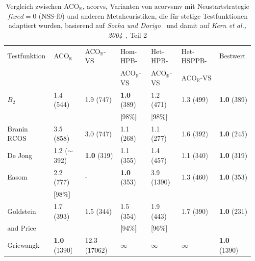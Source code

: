 \documentclass[fontsize=12, a4aper]{scrartcl}
\begin{document}
	\begin{table}[H]
		
		\caption{Vergleich zwischen ACO\(_{\mathbb{R}}\), \acl{acorvs}, Varianten von \acl{acorvsmv} mit Neustartstrategie \(fixed = 0\) (NSS-f0) und anderen Metaheuristiken, die für stetige Testfunktionen adaptiert wurden, basierend auf \textit{Socha und Dorigo}~\cite{socha2008ant} und damit auf \textit{Kern et al., 2004}~\cite{kern2004learning}, Teil 2}
		
		\label{subsec:Vergleich_Von_ACO_R_ACO_R_Very_Simple_Und_Iterationen:tab:Vergleich_Mit_Meta_-_Heuristiken_Adaptiert_Fuer_Stetige_Probleme_Teil_2}
		
		\scriptsize
		
		\begin{tabularx}{\linewidth}{ l l l l l l l}
			
			\toprule
			
			Testfunktion & ACO\(_{\mathbb{R}}\) & ACO\(_{\mathbb{R}}\)-VS & Hom-HPB- & Het-HPB- & Het-HSPPB- & Bestwert\\
			& & & ACO\(_\mathbb{R}\)-VS & ACO\(_\mathbb{R}\)-VS & ACO\(_\mathbb{R}\)-VS & \\

			\midrule
			
			\(B_2\) &  1.4 (544) & 1.9 (747) & \textbf{1.0} (389) & 1.2 (471) & 1.3 (499) & \textbf{1.0} (389)\\
			
			& & & [98\%] & [98\%] & & \\
			
			Branin RCOS & 3.5 (858) & 3.0 (747) & 1.1 (268) & 1.1 (277) & 1.6 (392) & \textbf{1.0} (245)\\
			
			De Jong & 1.2 (\(\sim\)392) & \textbf{1.0} (319) & 1.1 (355) & 1.4 (457) & 1.1 (340) & \textbf{1.0} (319)\\
			
			Easom & 2.2 (777) & - & \textbf{1.0} (353) & 3.9 (1390) & 1.3 (460) & \textbf{1.0} (353)\\
			
			& [98\%] & & & & & \\
			
			Goldstein & 1.7 (393) & 1.5 (344) & 1.5 (354) & 1.9 (443) & 1.7 (390) & \textbf{1.0} (231)\\
			
			and Price & & & [94\%] & [96\%] & & \\
			
			Griewangk & \textbf{1.0} (1390) & 12.3 (17062) & \(\infty\) & \(\infty\) & \(\infty\) & \textbf{1.0} (1390)\\
			

\end{tabularx}
\end{table}
\end{document}
